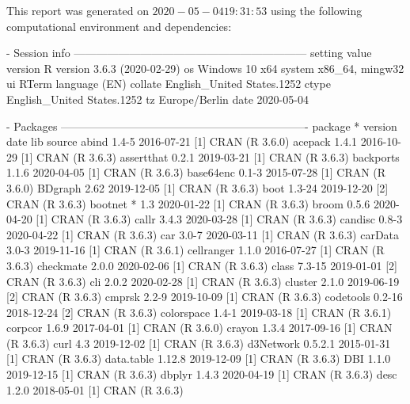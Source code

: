 \documentclass[a4paper,12pt]{article} %
\begin{document}
{This report was generated on $2020-05-04 19:31:53$ using the following computational environment and dependencies:


\begin{Schunk}
\begin{Soutput}
- Session info ---------------------------------------------------------------
 setting  value                       
 version  R version 3.6.3 (2020-02-29)
 os       Windows 10 x64              
 system   x86_64, mingw32             
 ui       RTerm                       
 language (EN)                        
 collate  English_United States.1252  
 ctype    English_United States.1252  
 tz       Europe/Berlin               
 date     2020-05-04                  

- Packages -------------------------------------------------------------------
 package        * version    date       lib source        
 abind            1.4-5      2016-07-21 [1] CRAN (R 3.6.0)
 acepack          1.4.1      2016-10-29 [1] CRAN (R 3.6.3)
 assertthat       0.2.1      2019-03-21 [1] CRAN (R 3.6.3)
 backports        1.1.6      2020-04-05 [1] CRAN (R 3.6.3)
 base64enc        0.1-3      2015-07-28 [1] CRAN (R 3.6.0)
 BDgraph          2.62       2019-12-05 [1] CRAN (R 3.6.3)
 boot             1.3-24     2019-12-20 [2] CRAN (R 3.6.3)
 bootnet        * 1.3        2020-01-22 [1] CRAN (R 3.6.3)
 broom            0.5.6      2020-04-20 [1] CRAN (R 3.6.3)
 callr            3.4.3      2020-03-28 [1] CRAN (R 3.6.3)
 candisc          0.8-3      2020-04-22 [1] CRAN (R 3.6.3)
 car              3.0-7      2020-03-11 [1] CRAN (R 3.6.3)
 carData          3.0-3      2019-11-16 [1] CRAN (R 3.6.1)
 cellranger       1.1.0      2016-07-27 [1] CRAN (R 3.6.3)
 checkmate        2.0.0      2020-02-06 [1] CRAN (R 3.6.3)
 class            7.3-15     2019-01-01 [2] CRAN (R 3.6.3)
 cli              2.0.2      2020-02-28 [1] CRAN (R 3.6.3)
 cluster          2.1.0      2019-06-19 [2] CRAN (R 3.6.3)
 cmprsk           2.2-9      2019-10-09 [1] CRAN (R 3.6.3)
 codetools        0.2-16     2018-12-24 [2] CRAN (R 3.6.3)
 colorspace       1.4-1      2019-03-18 [1] CRAN (R 3.6.1)
 corpcor          1.6.9      2017-04-01 [1] CRAN (R 3.6.0)
 crayon           1.3.4      2017-09-16 [1] CRAN (R 3.6.3)
 curl             4.3        2019-12-02 [1] CRAN (R 3.6.3)
 d3Network        0.5.2.1    2015-01-31 [1] CRAN (R 3.6.3)
 data.table       1.12.8     2019-12-09 [1] CRAN (R 3.6.3)
 DBI              1.1.0      2019-12-15 [1] CRAN (R 3.6.3)
 dbplyr           1.4.3      2020-04-19 [1] CRAN (R 3.6.3)
 desc             1.2.0      2018-05-01 [1] CRAN (R 3.6.3)

\end{Soutput}
\end{Schunk}}
\end{document}
